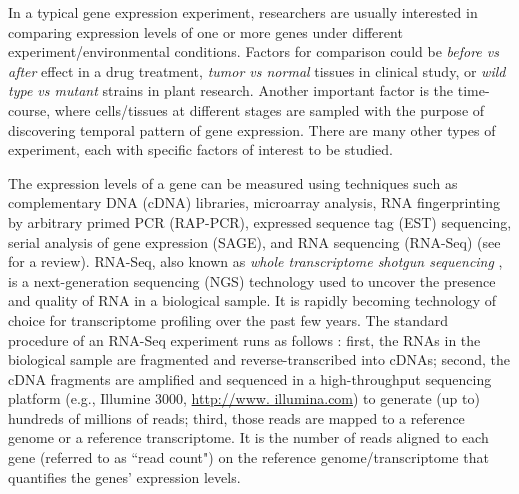 


In a typical gene expression experiment, researchers are usually interested in comparing expression
levels of one or more genes under different experiment/environmental conditions. Factors for 
comparison could be \textit{before vs after} effect in a drug treatment, \textit{tumor vs normal} 
tissues in clinical study, or \textit{wild type vs mutant} strains in plant research. Another 
important factor is the time-course, where cells/tissues at different stages are sampled with the 
purpose of discovering temporal pattern of gene expression. There are many other types of 
experiment, each with specific factors of interest to be studied.


The  expression levels of a gene can be measured using techniques such as
complementary DNA (cDNA) libraries, microarray analysis, RNA fingerprinting by arbitrary primed PCR
(RAP-PCR), expressed sequence tag (EST) sequencing, serial analysis of gene expression (SAGE), and
RNA sequencing (RNA-Seq) (see \cite{casassola2013gene} for a review).
RNA-Seq, also known as \textit{whole transcriptome shotgun sequencing}
\citep{morin2008profiling}, is a next-generation sequencing (NGS) technology used to uncover the
presence and quality of RNA in a biological sample.  It is rapidly becoming technology of choice
for transcriptome profiling over the past few years. 
The standard procedure of an RNA-Seq experiment runs as follows 
\citep{finotello2015measuring}: first, the RNAs in the biological sample are fragmented and
reverse-transcribed into cDNAs; second, the cDNA fragments are amplified and sequenced in a
high-throughput sequencing platform (e.g., Illumine 3000, \url{http://www. illumina.com}) to
generate (up to) hundreds of millions of reads; third, those reads are mapped to a reference
genome
or a reference transcriptome.
It is the number of reads aligned to each gene (referred to as ``read count") on the reference
genome/transcriptome that quantifies the genes' expression levels.  


